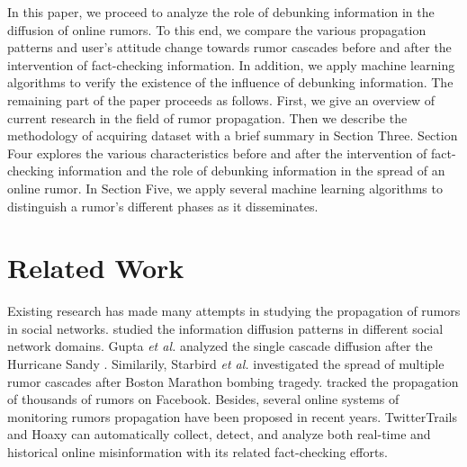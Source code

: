 \documentclass[conference]{IEEEtran}
\begin{document}
	In this paper, we proceed to analyze the role of debunking information in the diffusion of online rumors. To this end, we compare the various propagation patterns and user's attitude change towards rumor cascades before and after the intervention of fact-checking information. In addition, we apply machine learning algorithms to verify the existence of the influence of debunking information. The remaining part of the paper proceeds as follows. First, we give an overview of current research in the field of rumor propagation. Then we describe the methodology of acquiring dataset with a brief summary in Section Three. Section Four explores the various characteristics before and after the intervention of fact-checking information and the role of debunking information in the spread of an online rumor. In Section Five, we apply several machine learning algorithms to distinguish a rumor's different phases as it disseminates.  
	
	\section{Related Work}
	Existing research has made many attempts in studying the propagation of rumors in social networks. \cite{goel2012structure} studied the information diffusion patterns in different social network domains. Gupta \textit{et al.} analyzed the single cascade diffusion after the Hurricane Sandy \cite{gupta2013faking}. Similarily, Starbird \textit{et al.} \cite{starbird2014rumors} investigated the spread of multiple rumor cascades after Boston Marathon bombing tragedy. \cite{friggeri2014rumor} tracked the propagation of thousands of rumors on Facebook. Besides, several online systems of monitoring rumors propagation have been proposed in recent years. TwitterTrails \cite{metaxas2015using} and Hoaxy \cite{shao2016hoaxy} can automatically collect, detect, and analyze both real-time and historical online misinformation with its related fact-checking efforts. 
	
\end{document}
